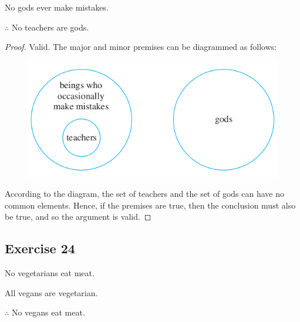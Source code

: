 \documentclass[14pt]{extarticle}
\begin{document}
No gods ever make mistakes.

$\therefore$ No teachers are gods.

\begin{proof}
Valid. The major and minor premises can be diagrammed as follows:

\begin{figure}[ht!]
\centering
\includegraphics[scale=0.5]{../images/3.4.23.png}
\end{figure}

According to the diagram, the set of teachers and the set of gods can have no common elements. Hence, if the premises are true, then the conclusion must also be true, and so the argument is valid.
\end{proof}

\subsection{Exercise 24}
No vegetarians eat meat.

All vegans are vegetarian.

$\therefore$ No vegans eat meat.
\end{document}
